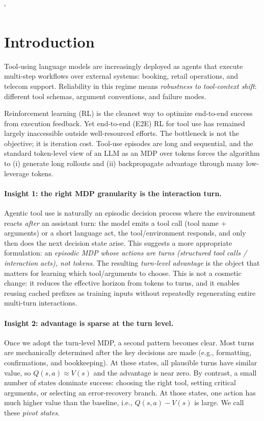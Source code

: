 `\section{Introduction}

Tool-using language models are increasingly deployed as agents that execute multi-step workflows over external systems: booking, retail operations, and telecom support.
Reliability in this regime means \emph{robustness to tool-context shift}: different tool schemas, argument conventions, and failure modes.

Reinforcement learning (RL) is the cleanest way to optimize end-to-end success from execution feedback.
Yet end-to-end (E2E) RL for tool use has remained largely inaccessible outside well-resourced efforts.
The bottleneck is not the objective; it is iteration cost.
Tool-use episodes are long and sequential, and the standard token-level view of an LLM as an MDP over tokens forces the algorithm to (i) generate long rollouts and (ii) backpropagate advantage through many low-leverage tokens.

\paragraph{Insight 1: the right MDP granularity is the interaction turn.}
Agentic tool use is naturally an episodic decision process where the environment reacts \emph{after} an assistant turn:
the model emits a tool call (tool name + arguments) or a short language act, the tool/environment responds, and only then does the next decision state arise.
This suggests a more appropriate formulation: an \emph{episodic MDP whose actions are turns (structured tool calls / interaction acts), not tokens}.
The resulting \emph{turn-level advantage} is the object that matters for learning which tool/arguments to choose.
This is not a cosmetic change: it reduces the effective horizon from tokens to turns, and it enables reusing cached prefixes as training inputs without repeatedly regenerating entire multi-turn interactions.

\paragraph{Insight 2: advantage is sparse at the turn level.}
Once we adopt the turn-level MDP, a second pattern becomes clear.
Most turns are mechanically determined after the key decisions are made (e.g., formatting, confirmations, and bookkeeping).
At these states, all plausible turns have similar value, so $Q(s,a)\approx V(s)$ and the advantage is near zero.
By contrast, a small number of states dominate success: choosing the right tool, setting critical arguments, or selecting an error-recovery branch.
At those states, one action has much higher value than the baseline, i.e., $Q(s,a)-V(s)$ is large.
We call these \emph{pivot states}.

